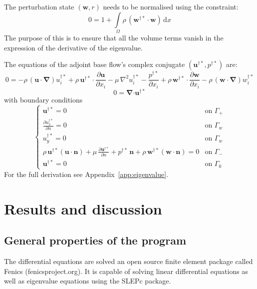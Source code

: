 \documentclass[12pt, a4paper]{article}
\begin{document}
    The perturbation state $(\mathbf{w}, r)$ needs to be normalised using the constraint:
    \begin{equation}
    0 = 1 + \int\limits_{\Omega}
    \rho \, (\mathbf{w^{\dagger*} \cdot w})
    \, \mathrm{d} x
    \end{equation}
    The purpose of this is to ensure that all the volume terms vanish in the expression of the derivative of the eigenvalue.
    
    The equations of the adjoint base flow's complex conjugate $(\mathbf{u^{\dagger*}}, p^{\dagger*})$ are:
    \begin{equation}
    0 = - \rho \, (\mathbf{u \cdot} \boldsymbol{\nabla}) u^{\dagger*}_i + 
    \rho \, \mathbf{u^{\dagger*} \cdot} \frac{\partial \mathbf{u}}{\partial x_i} - 
    \mu \, \nabla^2 u^{\dagger*}_i - 
    \frac{p^{\dagger*}}{\partial x_i} + 
    \rho \, \mathbf{w^{\dagger*} \cdot} \frac{\partial \mathbf{w}}{\partial x_i} - 
    \rho \, (\mathbf{w \cdot} \boldsymbol{\nabla}) w^{\dagger*}_i
    \end{equation}
    \begin{equation}
    0 = \boldsymbol{\nabla} \mathbf{\cdot u^{\dagger*}}
    \end{equation}
    with boundary conditions
    \begin{equation}
    \begin{cases}
    \mathbf{u^{\dagger*}} = 0 & \text{on } \Gamma_+ \\
    \frac{\partial u^{\dagger*}_x}{\partial n} = 0 & \text{on } \Gamma_w \\
    u^{\dagger*}_y = 0 & \text{on } \Gamma_w \\
    \rho \, \mathbf{u^{\dagger*}} (\mathbf{u \cdot n}) + \mu \, \frac{\partial \mathbf{u^{\dagger*}}}{\partial n} + 
    p^{\dagger*} \, \mathbf{n} + \rho \, \mathbf{w^{\dagger*}} (\mathbf{w \cdot n}) = 0 & \text{on } \Gamma_- \\
    \mathbf{u^{\dagger*}} = 0 & \text{on } \Gamma_0
    \end{cases}
    \end{equation}
    For the full derivation see Appendix~\ref{app:eigenvalue}.
    
\section{Results and discussion}
\subsection{General properties of the program}
The differential equations are solved an open source finite element package called Fenics (fenicsproject.org). It is capable of solving linear differential equations as well as eigenvalue equations using the SLEPc package.
\end{document}

